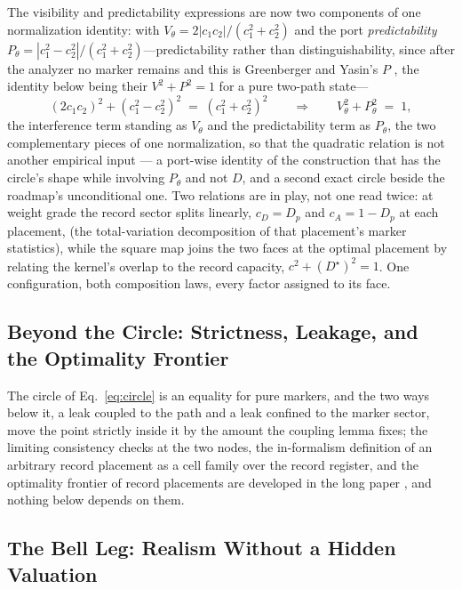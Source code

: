 The visibility and predictability expressions are now two components of one normalization identity: with $V_\theta = 2|c_1 c_2|/(c_1^2 + c_2^2)$ and the port \emph{predictability} $P_\theta = |c_1^2 - c_2^2|/(c_1^2 + c_2^2)$---predictability rather than distinguishability, since after the analyzer no marker remains and this is Greenberger and Yasin's $P$ \cite{greenberger1988}, the identity below being their $V^2 + P^2 = 1$ for a pure two-path state---
\begin{equation}\label{eq:portidentity}
(2 c_1 c_2)^{2} + (c_1^{2} - c_2^{2})^{2} \;=\; (c_1^{2} + c_2^{2})^{2} \qquad\Longrightarrow\qquad V_\theta^{2} + P_\theta^{2} \;=\; 1,
\end{equation}
the interference term standing as $V_\theta$ and the predictability term as $P_\theta$, the two complementary pieces of one normalization, so that the quadratic relation is not another empirical input --- a port-wise identity of the construction that has the circle's shape while involving $P_\theta$ and not $D$, and a second exact circle beside the roadmap's unconditional one. Two relations are in play, not one read twice: at weight grade the record sector splits linearly, $c_D = D_p$ and $c_A = 1 - D_p$ at each placement, (the total-variation decomposition of that placement's marker statistics), while the square map joins the two faces at the optimal placement by relating the kernel's overlap to the record capacity, $c^2 + (D^{\star})^2 = 1$. One configuration, both composition laws, every factor assigned to its face.







\subsection{Beyond the Circle: Strictness, Leakage, and the Optimality Frontier}\label{sec:beyond}

The circle of Eq.~\eqref{eq:circle} is an equality for pure markers, and the two ways below it, a leak coupled to the path and a leak confined to the marker sector, move the point strictly inside it by the amount the coupling lemma fixes; the limiting consistency checks at the two nodes, the in-formalism definition of an arbitrary record placement as a cell family over the record register, and the optimality frontier of record placements are developed in the long paper \cite{Aethus}, and nothing below depends on them.

\subsection{The Bell Leg: Realism Without a Hidden Valuation}\label{sec:bell}

